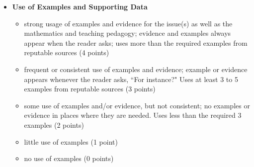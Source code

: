 \documentclass[11pt,letterpaper]{article}
\begin{document}
\begin{itemize}
\item  \textbf{Use of Examples and Supporting Data}
\begin{itemize}
\item[\underline{\hspace{.2in}}] strong usage of examples and evidence for the issue(s) as well as the mathematics and teaching pedagogy; evidence and examples always appear when the reader asks; uses more than the required examples from reputable sources (4 points)
\item[\underline{\hspace{.2in}}]  frequent or consistent use of examples and evidence; example or evidence appears whenever the reader asks, ``For instance?" Uses at least 3 to 5 examples from reputable sources (3 points)
\item[\underline{\hspace{.2in}}] some use of examples and/or evidence, but not consistent; no examples or evidence in places where they are needed. Uses less than the required 3 examples (2 points)
\item[\underline{\hspace{.2in}}] little use of examples (1 point)
\item[\underline{\hspace{.2in}}] no use of examples (0 points)
\end{itemize}


\end{itemize}
\end{document}
